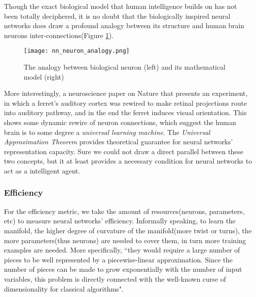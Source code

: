 \documentclass[letterpaper,10pt]{article}
\theoremstyle{definition}
\begin{document}
Though the exact biological model that human intelligence builds on has not been
totally deciphered, it is no doubt that the biologically inspired neural networks
does draw a profound analogy between its structure and human brain neurons
inter-connections(Figure \ref{fig:nn_neuron_analogy_analogy}).

\begin{figure}[h]
\centering
\texttt{[image: nn\_neuron\_analogy.png]}
\caption{The analogy between biological neuron (left) and its mathematical model (right)\protect\footnotemark}
\label{fig:nn_neuron_analogy_analogy}
\end{figure}


More interestingly, a neuroscience paper\cite{sharma2000induction} on Nature that
presents an experiment, in which a ferret's auditory cortex was rewired to
make retinal projections route into auditory pathway, and in the end the ferret
induces visual orientation. This shows some dynamic rewire of neuron connections,
which suggest the human brain is to some degree a \emph{universal learning machine}.
The \emph{Universal Approximation Theorem} provides theoretical guarantee for neural
networks' representation capacity. Sure we could not draw a direct parallel
between these two concepts, but it at least provides a necessary condition for
neural networks to act as a intelligent agent.

\subsubsection{Efficiency}\label{efficiency_of_nn_sec}

For the efficiency metric, we take the amount of resources(neurons, parameters,
etc) to measure neural networks' efficiency. Informally speaking, to learn the
manifold, the higher degree of curvature of the manifold(more twist or turns),
the more parameters(thus neurons) are needed to cover them, in turn more
training examples are needed. More specifically, ``they would require a large
number of pieces to be well represented by a piecewise-linear approximation.
Since the number of pieces can be made to grow exponentially with the number of
input variables, this problem is directly connected with the well-known curse
of dimensionality for classical algorithms"\cite{bengio2007scaling}.
\end{document}
